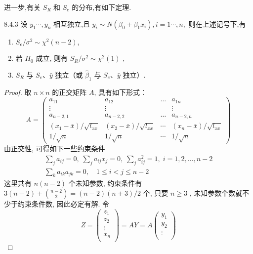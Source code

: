 进一步,有关 $S_R$ 和 $S_e$ 的分布,有如下定理.
\begin{theorem}{}{8.4.3}
设 $y_1\cdots,y_n$ 相互独立,且 $y_i\sim N(\beta_0+\beta_1x_i),i=1\cdots,n,$ 则在上述记号下,有
\begin{enumerate}
  \item  $S_e/\sigma^2 \sim \chi^2(n-2)$,
  \item  若 $H_0$ 成立, 则有 $S_R/\sigma^2 \sim \chi^{2}(1)$ ,
  \item  $S_R$ 与 $S_e$、$\bar{y}$ 独立（或 $\hat{\beta}_{1}$ 与 $S_e$、$\bar{y}$ 独立）.
\end{enumerate}
\end{theorem}
\begin{proof}
取 $n \times n$ 的正交矩阵 $A$, 具有如下形式：
\begin{equation*}
A=\left(\begin{array}{cccc}{a_{11}} & {a_{12}} & {\dots} & {a_{1 n}} \\ {\vdots} & {\vdots} & {} & {\vdots} \\ {a_{n-2,1}} & {a_{n-2,2}} & {\dots} & {a_{n-2, n}} \\ {\left(x_{1}-\bar{x}\right) / \sqrt{l_{x x}}} & {\left(x_{2}-\bar{x}\right) / \sqrt{l_{x x}}} & {\cdots} & {\left(x_{n}-\bar{x}\right) / \sqrt{l_{x x}}} \\ {1 / \sqrt{n}} & {1 / \sqrt{n}} & {\cdots} & {1 / \sqrt{n}}\end{array}\right)
\end{equation*}
由正交性, 可得如下一些约束条件
\begin{gather*}
\sum_{j} a_{i j}=0,\; \sum_{j} a_{i j} x_{j}=0,\;  \sum_{j} a_{i j}^{2}=1,\;  i = 1, 2, \ldots, n-2 \\ 
\sum_{k} a_{i k} a_{j k}=0, \quad 1 \leqslant i<j \leqslant n-2 
\end{gather*}
这里共有 $n(n-2)$ 个未知参数, 约束条件有 $ 3(n-2)+\binom{n-2}{2} = (n - 2)(n + 3)/2$ 个, 只要 $n \ge 3$ , 未知参数个数就不少于约束条件数, 因此必定有解. 令
\begin{equation*}
Z=
\begin{pmatrix}
z_1\\
z_2\\
\vdots\\
x_n\\
\end{pmatrix}
=AY = A 
\begin{pmatrix}
y_1\\
y_2\\
\vdots\\

\end{pmatrix}
\end{equation*}
\end{proof}
